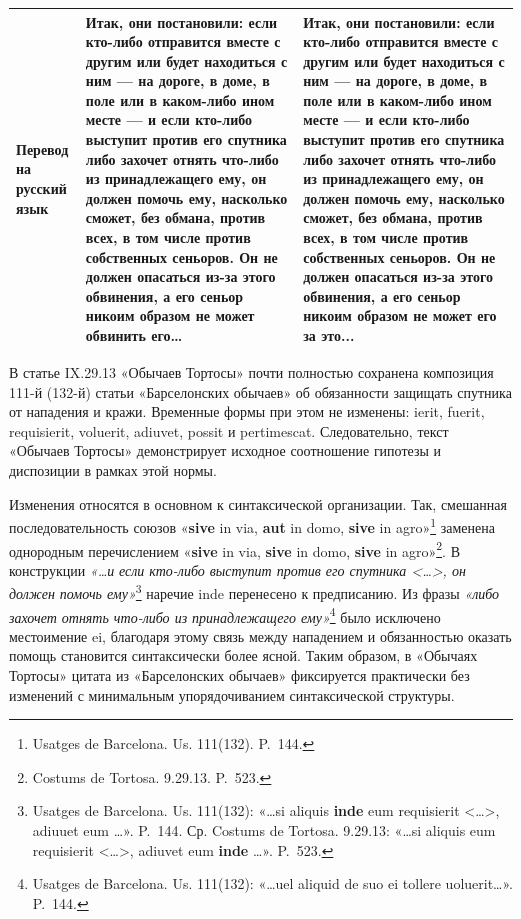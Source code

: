 \begin{center}
\begin{longtable}{|p{}|p{}|p{}|}
\textbf{Перевод на русский язык} & Итак, они постановили: если кто-либо отправится вместе с другим или будет находиться с ним --- на дороге, в доме, в поле или в каком-либо ином месте --- и если кто-либо выступит против его спутника либо захочет отнять что-либо из принадлежащего ему, он должен помочь ему, насколько сможет, без обмана, против всех, в том числе против собственных сеньоров. Он не должен опасаться из-за этого обвинения, а его сеньор никоим образом не может обвинить его… & Итак, они постановили: если кто-либо отправится вместе с другим или будет находиться с ним --- на дороге, в доме, в поле или в каком-либо ином месте --- и если кто-либо выступит против его спутника либо захочет отнять что-либо из принадлежащего ему, он должен помочь ему, насколько сможет, без обмана, против всех, в том числе против собственных сеньоров. Он не должен опасаться из-за этого обвинения, а его сеньор никоим образом не может его за это... \\ \hline
\end{longtable}
\end{center}

В статье IX.29.13 «Обычаев Тортосы» почти полностью сохранена композиция 111-й (132-й) статьи «Барселонских обычаев» об обязанности защищать спутника от нападения и кражи. Временные формы при этом не изменены: ierit, fuerit, requisierit, voluerit, adiuvet, possit и pertimescat. Следовательно, текст «Обычаев Тортосы» демонстрирует исходное соотношение гипотезы и диспозиции в рамках этой нормы.

Изменения относятся в основном к синтаксической организации. Так, смешанная последовательность союзов «\textbf{sive} in via, \textbf{aut} in domo, \textbf{sive} in agro»\footnote{Usatges de Barcelona. Us. 111(132). P.~144.} заменена однородным перечислением «\textbf{sive} in via, \textbf{sive} in domo, \textbf{sive} in agro»\footnote{Costums de Tortosa. 9.29.13. P.~523.}. В конструкции \emph{«}\emph{…}\emph{и}\emph{ если кто-либо выступит против его спутника <…>, он должен помочь ему}\emph{»}\footnote{Usatges de Barcelona. Us. 111(132): «…si aliquis \textbf{inde} eum requisierit <…>, adiuuet eum …». P.~144. Ср. Costums de Tortosa. 9.29.13: «…si aliquis eum requisierit <…>, adiuvet eum \textbf{inde} …». P.~523.} наречие inde перенесено к предписанию. Из фразы \emph{«}\emph{либо захочет отнять что-либо из принадлежащего ему}\emph{»}\footnote{Usatges de Barcelona. Us. 111(132): «…uel aliquid de suo ei tollere uoluerit…». P.~144.} было исключено местоимение ei, благодаря этому связь между нападением и обязанностью оказать помощь становится синтаксически более ясной. Таким образом, в «Обычаях Тортосы» цитата из «Барселонских обычаев» фиксируется практически без изменений с минимальным упорядочиванием синтаксической структуры.

